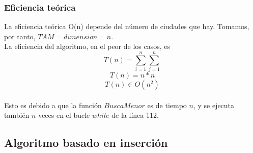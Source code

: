 \documentclass[11pt,a4paper]{article} %
\begin{document}
\subsubsection{Eficiencia teórica}
La eficiencia teórica O(n) depende del número de ciudades que hay. Tomamos, por tanto, $TAM = dimension = n$.\\

La eficiencia del algoritmo, en el peor de los casos, es 
$$T(n) = \sum_{i=1}^{n}\sum_{j=1}^{n}$$
$$T(n) = n*n$$
$$T(n) \in O(n^2)$$\\

Esto es debido a que la función $BuscaMenor$ es de tiempo $n$, y se ejecuta también $n$ veces en el bucle $while$ de la línea 112.



\newpage
\subsection{Algoritmo basado en inserción}
\end{document}
